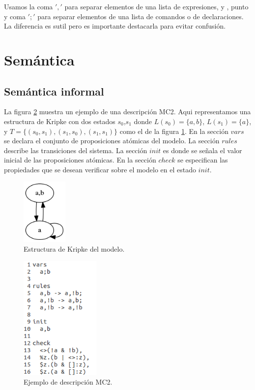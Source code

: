 Usamos la coma $','$ para separar elementos de una lista de expresiones, y , punto y coma $';'$ para separar elementos de una lista de comandos o de declaraciones. La diferencia es sutil pero es importante destacarla para evitar confusión.

\section{Semántica} 

\subsection{Semántica informal}

La figura \ref{fig:MC2-1} muestra un ejemplo de una descripción MC2. Aqui representamos una estructura de Kripke con dos estados $s_{0}$,$s_{1}$ donde $L(s_{0}) = \{a,b\}$, $L(s_{1}) = \{a\}$, y $T = \{(s_{0},s_{1}),(s_{1},s_{0}),(s_{1},s_{1})\}$ como el de la figura \ref{fig:kripke4}. En la sección $vars$ se declara el conjunto de proposiciones atómicas del modelo. La sección $rules$ describe las transiciones del sistema. La sección $init$ es donde se señala el valor inicial de las proposiciones atómicas. En la sección $check$ se especifican las propiedades que se desean verificar sobre el modelo en el estado $init$.

\begin{figure}[H]
  \centering
  \includegraphics[width=0.2\textwidth]{Figures/kripke4.png}
  \caption{Estructura de Kripke del modelo.}
  \label{fig:kripke4}
\end{figure}

\begin{figure}[H]
  \centering
  \includegraphics[width=0.35\textwidth]{Figures/modeloMC2-1.png}
  \caption{Ejemplo de descripción MC2.}
  \label{fig:MC2-1}
\end{figure}

